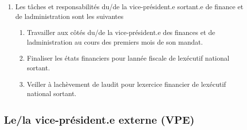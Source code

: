 \begin{enumerate}
 \item
  Les tâches et responsabilités du/de la vice-président.e sortant.e de finance et de l\textquotesingle administration sont les suivantes
  \begin{enumerate}
   \item
    Travailler aux côtés du/de la vice-président.e des finances et de l\textquotesingle administration au cours des premiers mois de son mandat.
   \item
    Finaliser les états financiers pour l\textquotesingle année fiscale de l\textquotesingle exécutif national sortant.
   \item
    Veiller à l\textquotesingle achèvement de l\textquotesingle audit pour l\textquotesingle exercice financier de l\textquotesingle exécutif national sortant.
  \end{enumerate}
\end{enumerate}

\subsection{Le/la vice-président.e externe (VPE)}
\label{le-la-vice-president-e-externe-vpe}


